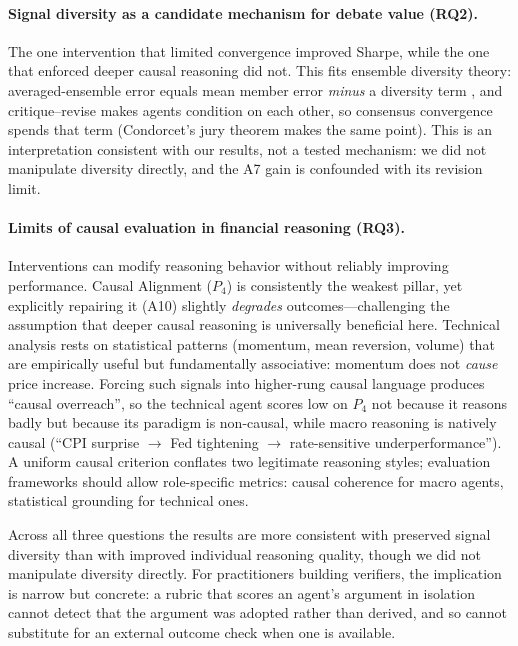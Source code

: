 \documentclass{article}
\begin{document}
\paragraph{Signal diversity as a candidate mechanism for debate value (RQ2).}
\vspace{-4pt}

The one intervention that limited convergence improved Sharpe, while the one that enforced deeper causal reasoning did not. This fits ensemble diversity theory: averaged-ensemble error equals mean member error \emph{minus} a diversity term \citep{krogh1994neural}, and critique--revise makes agents condition on each other, so consensus convergence spends that term (Condorcet's jury theorem makes the same point). This is an interpretation consistent with our results, not a tested mechanism: we did not manipulate diversity directly, and the A7 gain is confounded with its revision limit.

\vspace{-4pt}
\paragraph{Limits of causal evaluation in financial reasoning (RQ3).}
\vspace{-4pt}

Interventions can modify reasoning behavior without reliably improving performance. Causal Alignment ($P_4$) is consistently the weakest pillar, yet explicitly repairing it (A10) slightly \emph{degrades} outcomes---challenging the assumption that deeper causal reasoning is universally beneficial here. Technical analysis rests on statistical patterns (momentum, mean reversion, volume) that are empirically useful \citep{jegadeesh1993returns} but fundamentally associative: momentum does not \emph{cause} price increase. Forcing such signals into higher-rung causal language produces ``causal overreach'', so the technical agent scores low on $P_4$ not because it reasons badly but because its paradigm is non-causal, while macro reasoning is natively causal (``CPI surprise $\to$ Fed tightening $\to$ rate-sensitive underperformance''). A uniform causal criterion conflates two legitimate reasoning styles; evaluation frameworks should allow role-specific metrics: causal coherence for macro agents, statistical grounding for technical ones. 

Across all three questions the results are more consistent with preserved signal diversity than with improved individual reasoning quality, though we did not manipulate diversity directly. For practitioners building verifiers, the implication is narrow but concrete: a rubric that scores an agent's argument in isolation cannot detect that the argument was adopted rather than derived, and so cannot substitute for an external outcome check when one is available.
\end{document}
